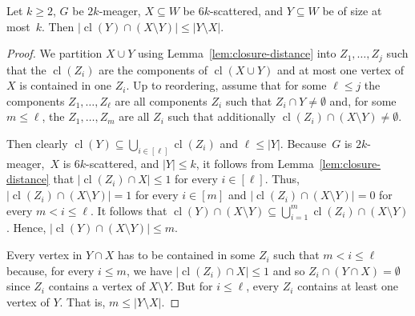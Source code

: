 \documentclass[]{lmcs}
\newcommand{\feetb}{W}
\newcommand{\footbset}{X}
\newcommand{\footbsetA}{X}
\newcommand{\footbsetB}{Y}
\newcommand{\footbsetC}{Z}
\newcommand{\closure}[1]{\operatorname{cl}(#1)}
\begin{document}
\begin{lem}
	\label{lem:closure-new-vertices}
	Let $k\geq 2$,
	$G$ be $2k$-meager,
	$\footbset \subseteq \feetb$ be $6k$-scattered,
	and $\footbsetB \subseteq \feetb$ be of size at most~$k$.
	Then $|\closure{\footbsetB} \cap (\footbset \setminus\footbsetB) | \leq |\footbsetB\setminus \footbset|$.
\end{lem}
\begin{proof}
	We partition $\footbset \cup \footbsetB$
	using Lemma~\ref{lem:closure-distance} into $\footbsetC_1, \dots , \footbsetC_j$
	such that the $\closure{\footbsetC_i}$ are the components of $\closure{\footbset \cup \footbsetB }$
	and at most one vertex of $\footbset$
	is contained in one $\footbsetC_i$.
	Up to reordering, assume that for some $\ell\leq j$ 
	the components $\footbsetC_1, \dots , \footbsetC_\ell$
	are all components $\footbsetC_i$ such that $\footbsetC_i \cap \footbsetB \neq \emptyset$
	and, for some $m \leq \ell$,
	the $\footbsetC_1, \dots , \footbsetC_m$
	are all $\footbsetC_i$ such that additionally $\closure{\footbsetC_i} \cap (\footbset \setminus\footbsetB) \neq \emptyset$.
	
	Then clearly $\closure{\footbsetB} \subseteq \bigcup_{i \in [\ell]}
	\closure{\footbsetC_i}$
	and $\ell \leq |\footbsetB|$.
	Because~$G$ is $2k$\nobreakdash-meager,~$\footbset$ is $6k$\nobreakdash-scattered, and $|\footbsetB|\leq k$,
	it follows from Lemma~\ref{lem:closure-distance} that
	$|\closure{\footbsetC_i} \cap \footbset| \leq 1$ for every $i \in [\ell]$.
	Thus, $|\closure{\footbsetC_i} \cap (\footbset\setminus \footbsetB)| = 1$
	for every $i \in [m]$
	and $|\closure{\footbsetC_i} \cap (\footbset\setminus \footbsetB)| = 0$
	for every $m < i \leq \ell$.
	It follows that
	$\closure{\footbsetB} \cap (\footbset \setminus\footbsetB) \subseteq \bigcup_{i=1}^m \closure{\footbsetC_i} \cap (\footbset \setminus\footbsetB)$.
	Hence, $|\closure{\footbsetB} \cap (\footbset \setminus\footbsetB)| \leq m$.
	
	Every vertex in $\footbsetB \cap \footbsetA$
	has to be contained in some $\footbsetC_i$  such that $m < i \leq \ell$
	because, for every $i \leq m$, we have $|\closure{\footbsetC_i} \cap \footbset| \leq 1$ and so
	$\footbsetC_i \cap (\footbsetB \cap \footbset) = \emptyset$
	since $\footbsetC_i$ contains a vertex of $\footbset \setminus \footbsetB$.
	But for $i \leq \ell$, every $\footbsetC_i$ contains at least one vertex of $\footbsetB$.
	That is, $m \leq |\footbsetB\setminus\footbset|$.
\end{proof}
\end{document}
